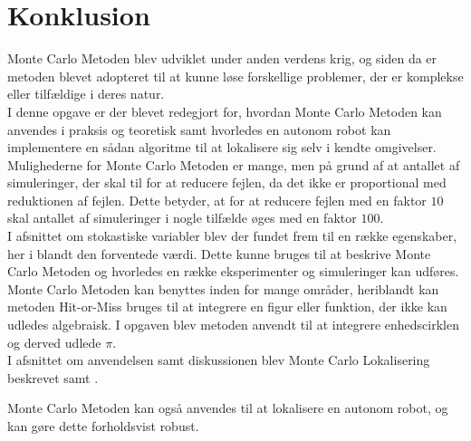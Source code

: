 \documentclass[../../SRP.tex]{subfiles}
\begin{document}
\chapter{Konklusion}
Monte Carlo Metoden blev udviklet under anden verdens krig, og siden da er metoden blevet adopteret til at kunne løse forskellige problemer, der er komplekse eller tilfældige i deres natur.  \\

I denne opgave er der blevet redegjort for, hvordan Monte Carlo Metoden kan anvendes i praksis og teoretisk samt hvorledes en autonom robot kan implementere en sådan algoritme til at lokalisere sig selv i kendte omgivelser. Mulighederne for Monte Carlo Metoden er mange, men på grund af at antallet af simuleringer, der skal til for at reducere fejlen, da det ikke er proportional med reduktionen af fejlen. Dette betyder, at for at reducere fejlen med en faktor $10$ skal antallet af simuleringer i nogle tilfælde øges med en faktor $100$. \\

I afsnittet om stokastiske variabler blev der fundet frem til en række egenskaber, her i blandt den forventede værdi. Dette kunne bruges til at beskrive Monte Carlo Metoden og hvorledes en række eksperimenter og simuleringer kan udføres. \\

Monte Carlo Metoden kan benyttes inden for mange områder, heriblandt kan metoden Hit-or-Miss bruges til at integrere en figur eller funktion, der ikke kan udledes algebraisk. I opgaven blev metoden anvendt til at integrere enhedscirklen og derved udlede $\pi$. \\

I afsnittet om anvendelsen samt diskussionen blev Monte Carlo Lokalisering beskrevet samt .

Monte Carlo Metoden kan også anvendes til at lokalisere en autonom robot, og kan gøre dette forholdsvist robust.
\end{document}
